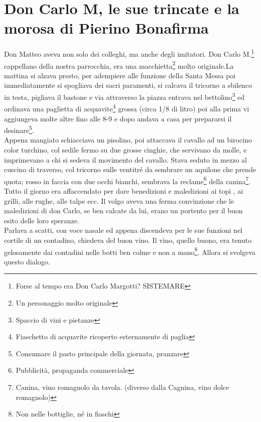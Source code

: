 \documentclass[10pt]{memoir} %
\begin{document}

\chapter{Don Carlo M, le sue trincate e la morosa di Pierino Bonafirma}
Don Matteo aveva non solo dei colleghi, ma anche degli imitatori. Don Carlo M.\footnote{Forse al tempo era Don Carlo Margotti? SISTEMARE} cappellano della nostra parrocchia, era una macchietta\footnote{Un personaggio molto originale} molto originale.La mattina si alzava presto, per adempiere alle funzione della Santa Messa poi immediatamente si spogliava dei sacri paramenti, si calcava il tricorno a sbilenco in testa, pigliava il bastone e via attraverso la piazza entrava nel bettolino\footnote{Spaccio di vini e pietanze} ed ordinava una paglietta di acquavite\footnote{Fiaschetto di acquavite ricoperto esternamente di paglia} grossa (circa 1/8 di litro) poi alla prima vi aggiungeva molte altre fino alle 8-9 e dopo andava a casa per prepararsi il desinare\footnote{Consumare il pasto principale della giornata, pranzare}.\\
Appena mangiato schiacciava un pisolino, poi attaccava il cavallo ad un birocino color turchino, col sedile fermo su due grosse cinghie, che servivano da molle, e imprimevano a chi si sedeva il movimento del cavallo. Stava seduto in mezzo al cuscino di traverso, col tricorno sulle ventitré da sembrare un aquilone che prende quota; rosso in faccia con due occhi bianchi, sembrava la reclame\footnote{Pubblicità, propaganda commerciale} della canina\footnote{Canina, vino romagnolo da tavola. (diverso dalla Cagnina, vino dolce romagnolo)}.\\ 
Tutto il giorno era affaccendato per dare benedizioni e maledizioni ai topi , ai grilli, alle rughe, alle talpe ecc. Il volgo aveva una ferma convinzione che le maledizioni di don Carlo, se ben calcate da lui, erano un portento per il buon esito delle loro speranze. \\
Parlava a scatti, con voce nasale ed appena discendeva per le sue funzioni nel cortile di un contadino, chiedeva del buon vino. Il vino, quello buono, era tenuto gelosamente dai contadini nelle botti ben colme e non a mano\footnote{Non nelle bottiglie, né in fiaschi}. Allora si svolgeva questo dialogo. \\
\end{document}

